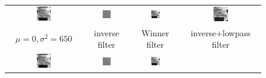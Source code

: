 \documentclass[11pt,a4paper]{article}
\begin{document}
\begin{figure}[!htbp]
	\centering
	\begin{tabular}{cccc} 
		\includegraphics[width=0.2\textwidth]{pro5/5_29_a}&
		\includegraphics[width=0.2\textwidth]{pro5/5_29_b}&
		\includegraphics[width=0.2\textwidth]{pro5/5_29_c}&
		\includegraphics[width=0.2\textwidth]{pro5/5_29_b+}\\
		$\mu=0,\sigma^2=650$ &  inverse filter &  Winner filter & inverse+lowpass filter\\
		\includegraphics[width=0.2\textwidth]{pro5/5_29_d}&
		\includegraphics[width=0.2\textwidth]{pro5/5_29_e}&
		\includegraphics[width=0.2\textwidth]{pro5/5_29_f}&

\end{tabular}
\end{figure}
\end{document}

